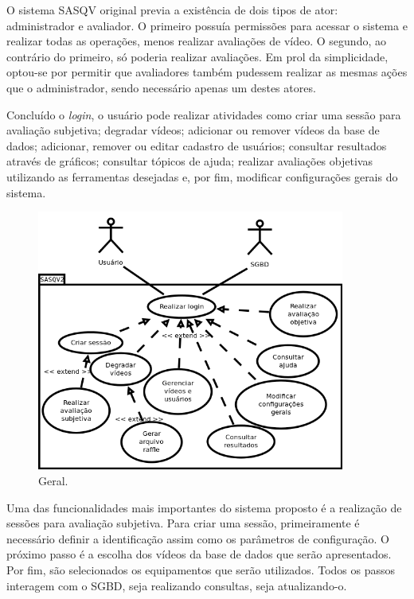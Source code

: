 O sistema SASQV original previa a existência de dois tipos de ator: administrador e avaliador. O primeiro possuía permissões para acessar o sistema e realizar todas as operações, menos realizar avaliações de vídeo. O segundo, ao contrário do primeiro, só poderia realizar avaliações. Em prol da simplicidade, optou-se por permitir que avaliadores também pudessem realizar as mesmas ações que o administrador, sendo necessário apenas um destes atores.

Concluído o \emph{login}, o usuário pode realizar atividades como criar uma sessão para avaliação subjetiva; degradar vídeos; adicionar ou remover vídeos da base de dados; adicionar, remover ou editar cadastro de usuários; consultar resultados através de gráficos; consultar tópicos de ajuda; realizar avaliações objetivas utilizando as ferramentas desejadas e, por fim, modificar configurações gerais do sistema.

\begin{figure}[!htb]
	\centering
	\includegraphics[width=0.9\textwidth]{./diagramas/casodeuso2.png}
	\caption{Geral.}
	\label{fig:ucdgeral}
\end{figure}

Uma das funcionalidades mais importantes do sistema proposto é a realização de sessões para avaliação subjetiva. Para criar uma sessão, primeiramente é necessário definir a identificação assim como os parâmetros de configuração. O próximo passo é a escolha dos vídeos da base de dados que serão apresentados. Por fim, são selecionados os equipamentos que serão utilizados. Todos os passos interagem com o SGBD, seja realizando consultas, seja atualizando-o.

